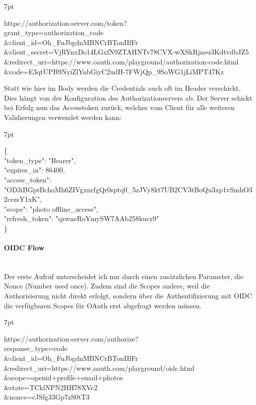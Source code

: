 \documentclass[notitlepage, hidelinks]{article}
\newenvironment{formal}{%
  \def\FrameCommand{%
    \hspace{1pt}%
    {\color{black}\vrule width 2pt}%
    {\color{formalshade}\vrule width 4pt}%
    \colorbox{formalshade}%
  }%
  \MakeFramed{\advance\hsize-\width\FrameRestore}%
  \noindent\hspace{-4.55pt}%
  \begin{adjustwidth}{}{7pt}%
  \vspace{2pt}\vspace{2pt}%
}
{%
  \vspace{2pt}\end{adjustwidth}\endMakeFramed%
}
\begin{document}
\begin{formal}
https://authorization-server.com/token?\\
grant\_type=authorization\_code\\
\&client\_id=Oh\_FuJbgdnMBNCrBTonIIfFr\\
\&client\_secret=VjRYnxDo14LGxfN9ZTAHNTv78CVX-wXSkRjneu3KdtvdbJZ5\\
\&redirect\_uri=https://www.oauth.com/playground/authorization-code.html\\
\&code=E3qtUPB9NyiZlYnbGiyC2udH-7FWjQp\_9SoWG1jLiMPT47Kz 
\end{formal}

Statt wie hier im Body werden die Credentials auch oft im Header verschickt. Dies hängt von der Konfiguration des Authorizationservers ab. Der Server schickt bei Erfolg nun das Accesstoken zurück, welches vom Client für alle weiteren Validierungen verwendet werden kann:

\begin{formal}
\{\\
  "token\_type": "Bearer",\\
  "expires\_in": 86400,\\
  "access\_token": "OD3iBGptBchoMh6ZIVgxnrfgQr0sptq0\_5zJVy8kt7UB2CV3tBoQu3xp1vSmhO32cezsY1xK",\\
  "scope": "photo offline\_access",\\
  "refresh\_token": "qzwneRoYmySW7AAb258kucz9"\\
\}
\end{formal} 

\paragraph{OIDC Flow} \mbox{} \\
Der erste Aufruf unterscheidet ich nur durch einen zusätzlichen Parameter, die Nonce (Number used once). Zudem sind die Scopes andere, weil die Authorisierung nicht direkt erfolgt, sondern über die Authentifizierung mit OIDC die verfügbaren Scopes für OAuth erst abgefragt werden müssen. 
\begin{formal}
https://authorization-server.com/authorize?\\
  response\_type=code\\
  \&client\_id=Oh\_FuJbgdnMBNCrBTonIIfFr\\
  \&redirect\_uri=https://www.oauth.com/playground/oidc.html\\
  \&scope=openid+profile+email+photos\\
  \&state=TCklNPN2HH78XVc2\\
  \&nonce=cJSfg33Gp7zS0tT3
\end{formal}
\end{document}
